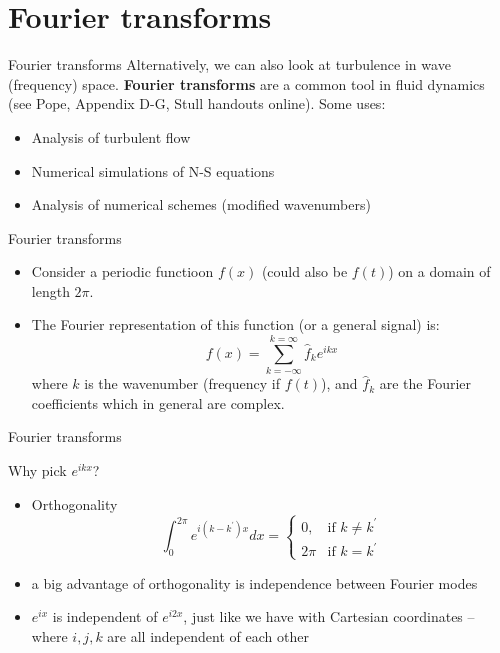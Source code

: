 \section{Fourier transforms} %
\begin{frame}{Fourier transforms}
Alternatively, we can also look at turbulence in wave (frequency) space. \textbf{Fourier transforms} are a common tool in fluid dynamics (see Pope, Appendix D-G, Stull handouts online).\newline\newline
Some uses:
\begin{itemize}
	\item Analysis of turbulent flow
	\item Numerical simulations of N-S equations
	\item Analysis of numerical schemes (modified wavenumbers)
\end{itemize}
\end{frame}

\begin{frame}{Fourier transforms}

\begin{itemize}
	\item Consider a periodic functioon $f(x)$ (could also be $f(t)$) on a domain of length $2\pi$.	
	\item The Fourier representation of this function (or a general signal) is:
	$$f(x) = \sum^{k=\infty}_{k=-\infty} \hat f_k e^{ikx}$$
	where $k$ is the wavenumber (frequency if $f(t)$), and $\hat f_k$ are the Fourier coefficients which in general are complex.
\end{itemize}
\end{frame}

\begin{frame}{Fourier transforms}

Why pick $e^{ikx}$?
\begin{itemize}
	\item Orthogonality $$\int^{2\pi}_{0} e^{i(k-k^\prime)x} dx = \begin{cases}
    0,& \text{if } k\neq k^\prime\\
    2\pi & \text{if } k=k^\prime
\end{cases}$$
	\item a big advantage of orthogonality is independence between Fourier modes
	\item $e^{ix}$ is independent of $e^{i2x}$, just like we have with Cartesian coordinates -- where $i,j,k$ are all independent of each other
	\end{itemize}
\end{frame}

